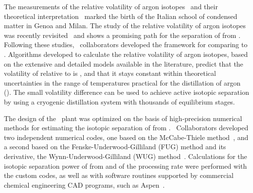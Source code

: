 The measurements of the relative volatility of argon isotopes~\cite{Boato:1962hg,Boato:1961hb,Boato:1959bn} and their theoretical interpretation~\cite{Casanova:1964gm,Casanova:1960dj,Fieschi:1961cd} marked the birth of the Italian school of condensed matter in Genoa and Milan.  The study of the relative volatility of argon isotopes was recently revisited~\cite{CanongiaLopes:2003ju,Calado:2000iq} and shows a promising path for the separation of  from .  Following these studies, \DS\ collaborators developed the framework for comparing  to .  Algorithms developed to calculate the relative volatility of argon isotopes, based on the extensive and detailed models available in the literature, predict that the volatility of  relative to  is \AriaArVolatiityRatio, and that it stays constant within theoretical uncertainties in the range of temperatures practical for the distillation of argon (\AriaArDistillationTemperatureRange).  The small volatility difference can be used to achieve active isotopic separation by using a cryogenic distillation system with thousands of equilibrium stages.

The design of the \Aria\ plant was optimized on the basis of high-precision numerical methods for estimating the isotopic separation of  from .  \DS\ Collaborators developed two independent numerical codes, one based on the McCabe-Thiele method~\cite{McCabe:1925be}, and a second based on the Fenske-Underwood-Gilliland (FUG) method and its derivative, the Wynn-Underwood-Gilliland (WUG) method~\cite{Underwood:1949dw,Gilliland:1940ja,Fenske:1932do}.  Calculations for the isotopic separation power of  from  and of the processing rate were performed with the custom codes, as well as with software routines supported by commercial chemical engineering CAD programs, such as Aspen~\cite{AspenTechnologyInc:2015ux}.

